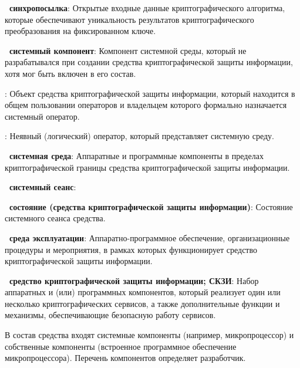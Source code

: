 {\bf \thedefctr~синхропосылка}:
Открытые входные данные криптографического алгоритма,
которые обеспечивают уникальность результатов 
криптографического преобразования на фиксированном ключе.

{\bf \thedefctr~системный компонент}:
Компонент системной среды, который не разрабатывался при создании средства
криптографической защиты информации, хотя мог быть включен в его состав.

: 
Объект средства криптографической защиты информации, 
который находится в общем пользовании операторов 
и владельцем которого формально назначается системный оператор.

\begin{note}
\end{note}

:
Неявный (логический) оператор, который представляет системную среду.

{\bf \thedefctr~системная среда}:
Аппаратные и программные компоненты в пределах криптографической границы
средства криптографической защиты информации.

{\bf \thedefctr~системный сеанс}:


{\bf \thedefctr~состояние (средства криптографической защиты информации)}:
Состояние системного сеанса средства.

{\bf \thedefctr~среда эксплуатации}:
Аппаратно-программное обеспечение, организационные процедуры и мероприятия,
в рамках которых функционирует средство криптографической защиты информации.

{\bf \thedefctr~средство криптографической защиты информации; СКЗИ}:
Набор аппаратных и (или) программных компонентов, который реализует один или 
несколько криптографических сервисов, а также дополнительные функции и 
механизмы, обеспечивающие безопасную работу сервисов.

\begin{note}
В состав средства входят системные компоненты (например, микропроцессор) и
собственные компоненты (встроенное программное обеспечение микропроцессора).
Перечень компонентов определяет разработчик.
\end{note}

